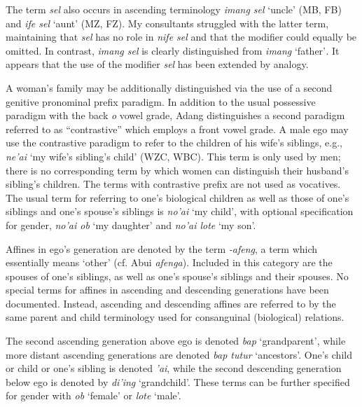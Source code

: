 The term \textit{sel} also occurs in ascending terminology \textit{imang sel} `uncle' (MB, FB) and \textit{ife sel} `aunt' (MZ, FZ). My consultants struggled with the latter term, maintaining that \textit{sel} has no role in \textit{nife sel} and that the modifier could equally be omitted. In contrast, \textit{imang sel} is clearly distinguished from \textit{imang} `father'\textit{.} It appears that the use of the modifier \textit{sel} has been extended by analogy.

A woman's family may be additionally distinguished via the use of a second genitive pronominal prefix paradigm. In addition to the usual possessive paradigm with the back \textit{o} vowel grade, Adang distinguishes a second paradigm referred to as ``contrastive'' \citep{Haan2001} which employs a front vowel grade. A male ego may use the contrastive paradigm to refer to the children of his wife's siblings, e.g., \textit{ne'ai} `my wife's sibling's child' (WZC, WBC). This term is only used by men; there is no corresponding term by which women can distinguish their husband's sibling's children. The terms with contrastive prefix are not used as vocatives. The usual term for referring to one's biological children as well as those of one's siblings and one's spouse's siblings is \textit{no'ai} `my child', with optional specification for gender, \textit{no'ai ob} `my daughter' and \textit{no'ai lote} `my son'.

Affines in ego's generation are denoted by the term \textit{{}-afeng}, a term which essentially means `other' (cf. Abui \textit{afenga}). Included in this category are the spouses of one's siblings, as well as one's spouse's siblings and their spouses. No special terms for affines in ascending and descending generations have been documented. Instead, ascending and descending affines are referred to by the same parent and child terminology used for consanguinal (biological) relations. 

The second ascending generation above ego is denoted \textit{bap} `grandparent', while more distant ascending generations are denoted \textit{bap tutur} `ancestors'. One's child or child or one's sibling is denoted \textit{'ai}, while the second descending generation below ego is denoted by \textit{di'ing} `grandchild'. These terms can be further specified for gender with \textit{ob} `female' or \textit{lote} `male'. 

 


